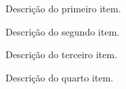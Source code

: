 \begin{description}
  \item[Primeiro Item] Descrição do primeiro item.
  \item[Segundo Item]   Descrição do segundo item.
  \item[Terceiro Item]  Descrição do terceiro item.
  \item[Quarto Item]    Descrição do quarto item.
\end{description}
